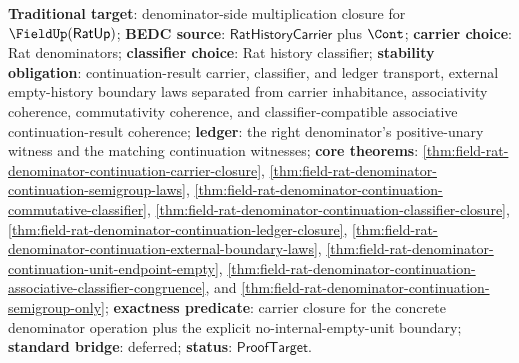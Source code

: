 \textbf{Traditional target}: denominator-side multiplication closure for
$\FieldUp(\mathsf{RatUp})$; \textbf{BEDC source}:
$\mathsf{RatHistoryCarrier}$ plus $\Cont$; \textbf{carrier choice}: Rat
denominators; \textbf{classifier choice}: Rat history classifier;
\textbf{stability obligation}: continuation-result carrier, classifier, and
ledger transport, external empty-history boundary laws separated from carrier
inhabitance, associativity coherence, commutativity coherence, and
classifier-compatible associative continuation-result coherence;
\textbf{ledger}: the right denominator's positive-unary witness and the
matching continuation witnesses; \textbf{core theorems}:
\autoref{thm:field-rat-denominator-continuation-carrier-closure},
\autoref{thm:field-rat-denominator-continuation-semigroup-laws},
\autoref{thm:field-rat-denominator-continuation-commutative-classifier},
\autoref{thm:field-rat-denominator-continuation-classifier-closure},
\autoref{thm:field-rat-denominator-continuation-ledger-closure},
\autoref{thm:field-rat-denominator-continuation-external-boundary-laws},
\autoref{thm:field-rat-denominator-continuation-unit-endpoint-empty},
\autoref{thm:field-rat-denominator-continuation-associative-classifier-congruence}, and
\autoref{thm:field-rat-denominator-continuation-semigroup-only};
\textbf{exactness predicate}: carrier closure for the concrete denominator
operation plus the explicit no-internal-empty-unit boundary;
\textbf{standard bridge}: deferred; \textbf{status}:
$\mathsf{ProofTarget}$.
